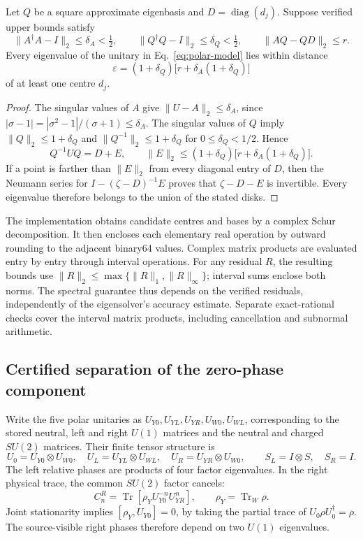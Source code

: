 \begin{proposition}\label{prop:polar-disks}
Let $Q$ be a square approximate eigenbasis and $D=\operatorname{diag}(d_j)$. Suppose verified upper bounds satisfy
\[
\|A^\dagger A-I\|_2\leq\delta_A<\tfrac12,\qquad
\|Q^\dagger Q-I\|_2\leq\delta_Q<\tfrac12,\qquad
\|AQ-QD\|_2\leq r.
\]
Every eigenvalue of the unitary in Eq.~\eqref{eq:polar-model} lies within distance
\begin{equation}\label{eq:polar-disk-radius}
\varepsilon=(1+\delta_Q)\bigl[r+\delta_A(1+\delta_Q)\bigr]
\end{equation}
of at least one centre $d_j$.
\end{proposition}
\begin{proof}
The singular values of $A$ give $\|U-A\|_2\leq\delta_A$, since
$|\sigma-1|=|\sigma^2-1|/(\sigma+1)\leq\delta_A$.
The singular values of $Q$ imply
$\|Q\|_2\leq1+\delta_Q$ and $\|Q^{-1}\|_2\leq1+\delta_Q$ for $0\leq\delta_Q<1/2$. Hence
\[
Q^{-1}UQ=D+E,\qquad
\|E\|_2\leq(1+\delta_Q)\bigl[r+\delta_A(1+\delta_Q)\bigr].
\]
If a point is farther than $\|E\|_2$ from every diagonal entry of $D$, then the Neumann series for $I-(\zeta-D)^{-1}E$ proves that $\zeta-D-E$ is invertible. Every eigenvalue therefore belongs to the union of the stated disks.
\end{proof}

The implementation obtains candidate centres and bases by a complex Schur decomposition. It then encloses each elementary real operation by outward rounding to the adjacent binary64 values. Complex matrix products are evaluated entry by entry through interval operations. For any residual $R$, the resulting bounds use
$\|R\|_2\leq\max\{\|R\|_1,\|R\|_\infty\}$; interval sums enclose both norms. The spectral guarantee thus depends on the verified residuals, independently of the eigensolver's accuracy estimate. Separate exact-rational checks cover the interval matrix products, including cancellation and subnormal arithmetic.

\subsection{Certified separation of the zero-phase component}
\label{sec:zero-phase-certificate}
Write the five polar unitaries as $U_{Y0},U_{YL},U_{YR},U_{W0},U_{WL}$, corresponding to the stored neutral, left and right $U(1)$ matrices and the neutral and charged $SU(2)$ matrices. Their finite tensor structure is
\[
U_0=U_{Y0}\otimes U_{W0},\quad
U_L=U_{YL}\otimes U_{WL},\quad
U_R=U_{YR}\otimes U_{W0},\qquad
S_L=I\otimes S,\quad S_R=I.
\]
The left relative phases are products of four factor eigenvalues. In the right physical trace, the common $SU(2)$ factor cancels:
\[
C_n^R=\operatorname{Tr}\!\left[\rho_Y U_{Y0}^{-n}U_{YR}^n\right],
\qquad \rho_Y=\operatorname{Tr}_{W}\rho.
\]
Joint stationarity implies $[\rho_Y,U_{Y0}]=0$, by taking the partial trace of $U_0\rho U_0^\dagger=\rho$. The source-visible right phases therefore depend on two $U(1)$ eigenvalues.

